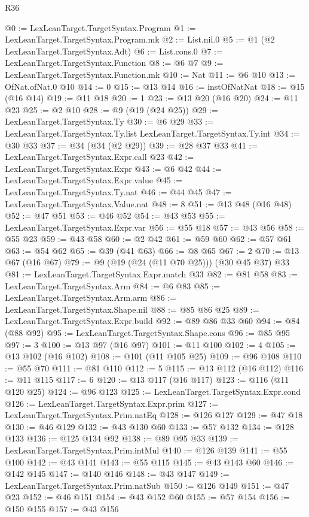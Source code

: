 \begin{lexlean}{R36}
\begin{coremodule}
@0 := LexLeanTarget.TargetSyntax.Program
@1 := LexLeanTarget.TargetSyntax.Program.mk
@2 := List.nil.{0}
@5 := @1 (@2 LexLeanTarget.TargetSyntax.Adt)
@6 := List.cons.{0}
@7 := LexLeanTarget.TargetSyntax.Function
@8 := @6 @7
@9 := LexLeanTarget.TargetSyntax.Function.mk
@10 := Nat
@11 := @6 @10
@13 := OfNat.ofNat.{0} @10
@14 := 0
@15 := @13 @14
@16 := instOfNatNat
@18 := @15 (@16 @14)
@19 := @11 @18
@20 := 1
@23 := @13 @20 (@16 @20)
@24 := @11 @23
@25 := @2 @10
@28 := @9 (@19 (@24 @25))
@29 := LexLeanTarget.TargetSyntax.Ty
@30 := @6 @29
@33 := LexLeanTarget.TargetSyntax.Ty.list LexLeanTarget.TargetSyntax.Ty.int
@34 := @30 @33
@37 := @34 (@34 (@2 @29))
@39 := @28 @37 @33
@41 := LexLeanTarget.TargetSyntax.Expr.call @23
@42 := LexLeanTarget.TargetSyntax.Expr
@43 := @6 @42
@44 := LexLeanTarget.TargetSyntax.Expr.value
@45 := LexLeanTarget.TargetSyntax.Ty.nat
@46 := @44 @45
@47 := LexLeanTarget.TargetSyntax.Value.nat
@48 := 8
@51 := @13 @48 (@16 @48)
@52 := @47 @51
@53 := @46 @52
@54 := @43 @53
@55 := LexLeanTarget.TargetSyntax.Expr.var
@56 := @55 @18
@57 := @43 @56
@58 := @55 @23
@59 := @43 @58
@60 := @2 @42
@61 := @59 @60
@62 := @57 @61
@63 := @54 @62
@65 := @39 (@41 @63)
@66 := @8 @65
@67 := 2
@70 := @13 @67 (@16 @67)
@79 := @9 (@19 (@24 (@11 @70 @25))) (@30 @45 @37) @33
@81 := LexLeanTarget.TargetSyntax.Expr.match @33
@82 := @81 @58
@83 := LexLeanTarget.TargetSyntax.Arm
@84 := @6 @83
@85 := LexLeanTarget.TargetSyntax.Arm.arm
@86 := LexLeanTarget.TargetSyntax.Shape.nil
@88 := @85 @86 @25
@89 := LexLeanTarget.TargetSyntax.Expr.build
@92 := @89 @86 @33 @60
@94 := @84 (@88 @92)
@95 := LexLeanTarget.TargetSyntax.Shape.cons
@96 := @85 @95
@97 := 3
@100 := @13 @97 (@16 @97)
@101 := @11 @100
@102 := 4
@105 := @13 @102 (@16 @102)
@108 := @101 (@11 @105 @25)
@109 := @96 @108
@110 := @55 @70
@111 := @81 @110
@112 := 5
@115 := @13 @112 (@16 @112)
@116 := @11 @115
@117 := 6
@120 := @13 @117 (@16 @117)
@123 := @116 (@11 @120 @25)
@124 := @96 @123
@125 := LexLeanTarget.TargetSyntax.Expr.cond
@126 := LexLeanTarget.TargetSyntax.Expr.prim
@127 := LexLeanTarget.TargetSyntax.Prim.natEq
@128 := @126 @127
@129 := @47 @18
@130 := @46 @129
@132 := @43 @130 @60
@133 := @57 @132
@134 := @128 @133
@136 := @125 @134 @92
@138 := @89 @95 @33
@139 := LexLeanTarget.TargetSyntax.Prim.intMul
@140 := @126 @139
@141 := @55 @100
@142 := @43 @141
@143 := @55 @115
@145 := @43 @143 @60
@146 := @142 @145
@147 := @140 @146
@148 := @43 @147
@149 := LexLeanTarget.TargetSyntax.Prim.natSub
@150 := @126 @149
@151 := @47 @23
@152 := @46 @151
@154 := @43 @152 @60
@155 := @57 @154
@156 := @150 @155
@157 := @43 @156

\end{coremodule}
\end{lexlean}
